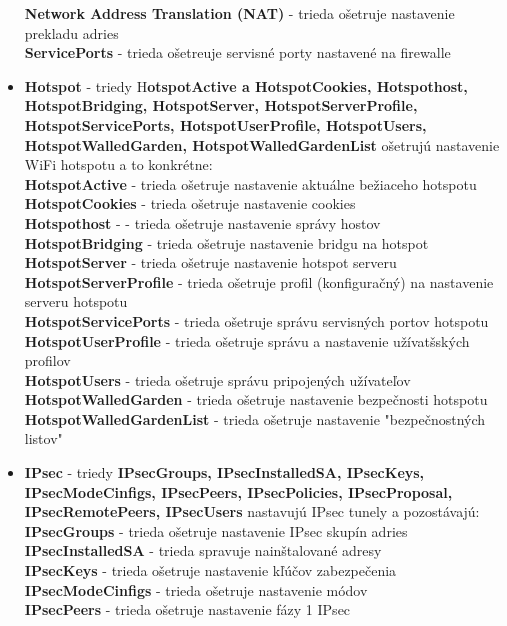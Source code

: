 \begin{itemize}
\textbf{Network Address Translation (NAT)} - trieda ošetruje  nastavenie prekladu adries\\
\textbf{ServicePorts} - trieda ošetreuje servisné porty nastavené na firewalle
\item \textbf{Hotspot} - triedy H\textbf{otspotActive a HotspotCookies, Hotspothost, HotspotBridging, HotspotServer, HotspotServerProfile, HotspotServicePorts, HotspotUserProfile, HotspotUsers, HotspotWalledGarden, HotspotWalledGardenList} ošetrujú nastavenie WiFi hotspotu  a to konkrétne:\\
\textbf{HotspotActive} - trieda ošetruje nastavenie aktuálne bežiaceho hotspotu\\
\textbf{HotspotCookies} - trieda ošetruje nastavenie cookies\\
\textbf{Hotspothost} - - trieda ošetruje nastavenie správy hostov\\
\textbf{HotspotBridging} - trieda ošetruje nastavenie bridgu na hotspot\\
\textbf{HotspotServer} - trieda ošetruje nastavenie hotspot serveru\\
\textbf{HotspotServerProfile} - trieda ošetruje profil (konfiguračný) na nastavenie serveru hotspotu\\
\textbf{HotspotServicePorts} - trieda ošetruje správu servisných portov hotspotu\\
\textbf{HotspotUserProfile} - trieda ošetruje správu a nastavenie užívatšských profilov\\
\textbf{HotspotUsers} - trieda ošetruje správu pripojených užívateľov\\
\textbf{HotspotWalledGarden} - trieda ošetruje nastavenie bezpečnosti hotspotu\\
\textbf{HotspotWalledGardenList} - trieda ošetruje nastavenie "bezpečnostných listov"
\item \textbf{IPsec} - triedy \textbf{IPsecGroups, IPsecInstalledSA, IPsecKeys, IPsecModeCinfigs, IPsecPeers, IPsecPolicies, IPsecProposal, IPsecRemotePeers, IPsecUsers} nastavujú IPsec tunely a pozostávajú:\\
\textbf{IPsecGroups} - trieda ošetruje nastavenie IPsec skupín adries\\
\textbf{IPsecInstalledSA} - trieda spravuje nainštalované adresy\\
\textbf{IPsecKeys} - trieda ošetruje nastavenie kľúčov zabezpečenia\\
\textbf{IPsecModeCinfigs} - trieda ošetruje nastavenie módov\\
\textbf{IPsecPeers} - trieda ošetruje nastavenie fázy 1 IPsec\\

\end{itemize}
